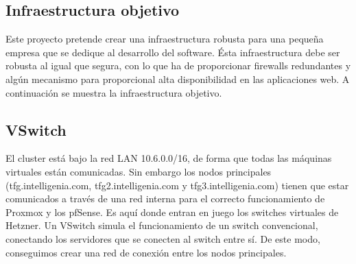 	\subsection{Infraestructura objetivo}
		\begin{text}
			Este proyecto pretende crear una infraestructura robusta para una pequeña empresa que se dedique al desarrollo del software. Ésta infraestructura debe ser robusta al igual que segura, con lo que ha de proporcionar firewalls redundantes y algún mecanismo para proporcional alta disponibilidad en las aplicaciones web.  A continuación se muestra la infraestructura objetivo.
		\end{text}
	
	\subsection{VSwitch}
	\begin{text}
		El cluster está bajo la red LAN 10.6.0.0/16, de forma que todas las máquinas virtuales están comunicadas. Sin embargo los nodos principales (tfg.intelligenia.com, tfg2.intelligenia.com y tfg3.intelligenia.com) tienen que estar comunicados a través de una red interna para el correcto funcionamiento de Proxmox y los pfSense.
		Es aquí donde entran en juego los switches virtuales de Hetzner. Un VSwitch simula el funcionamiento de un switch convencional, conectando los servidores que se conecten al switch entre sí. De este modo, conseguimos crear una red de conexión entre los nodos principales.
	\end{text}

